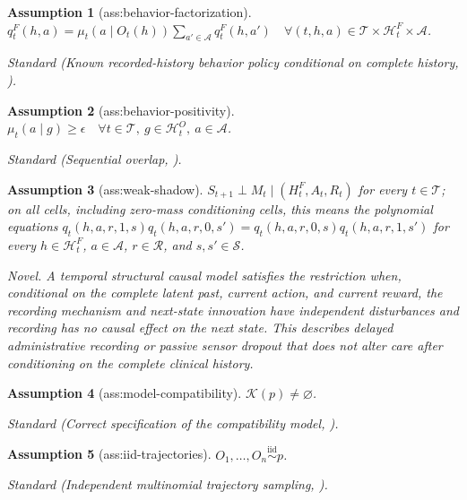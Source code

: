 \documentclass{article}
\newtheorem{assumption}{Assumption}
\begin{document}
\begin{assumption}[ass:behavior-factorization]\label{ass:behavior-factorization}
\(q_t^F(h,a)=\mu_t(a\mid O_t(h))\sum_{a'\in\mathcal A}q_t^F(h,a')\quad\forall (t,h,a)\in\mathcal T\times\mathcal H_t^F\times\mathcal A\).
\par\smallskip\noindent\emph{Standard} (Known recorded-history behavior policy conditional on complete history, \cite{KallusUehara2020}).
\end{assumption}

\begin{assumption}[ass:behavior-positivity]\label{ass:behavior-positivity}
\(\mu_t(a\mid g)\ge\epsilon\quad\forall t\in\mathcal T,\ g\in\mathcal H_t^O,\ a\in\mathcal A\).
\par\smallskip\noindent\emph{Standard} (Sequential overlap, \cite{KallusUehara2020}).
\end{assumption}

\begin{assumption}[ass:weak-shadow]\label{ass:weak-shadow}
\(S_{t+1}\perp M_t\mid(H_t^F,A_t,R_t)\) for every \(t\in\mathcal T\); on all cells, including zero-mass conditioning cells, this means the polynomial equations \(q_t(h,a,r,1,s)q_t(h,a,r,0,s')=q_t(h,a,r,0,s)q_t(h,a,r,1,s')\) for every \(h\in\mathcal H_t^F\), \(a\in\mathcal A\), \(r\in\mathcal R\), and \(s,s'\in\mathcal S\).
\par\smallskip\noindent\emph{Novel.} A temporal structural causal model satisfies the restriction when, conditional on the complete latent past, current action, and current reward, the recording mechanism and next-state innovation have independent disturbances and recording has no causal effect on the next state. This describes delayed administrative recording or passive sensor dropout that does not alter care after conditioning on the complete clinical history.
\end{assumption}

\begin{assumption}[ass:model-compatibility]\label{ass:model-compatibility}
\(\mathcal K(p)\ne\varnothing\).
\par\smallskip\noindent\emph{Standard} (Correct specification of the compatibility model, \cite{ChenChristensenTamer2018}).
\end{assumption}

\begin{assumption}[ass:iid-trajectories]\label{ass:iid-trajectories}
\(O_1,\ldots,O_n\overset{\mathrm{iid}}{\sim}p\).
\par\smallskip\noindent\emph{Standard} (Independent multinomial trajectory sampling, \cite{DuarteFinkelsteinKnoxMummoloShpitser2024}).
\end{assumption}
\end{document}
